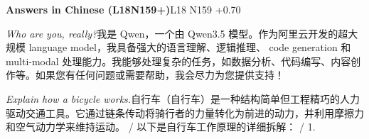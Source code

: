 \begin{multicols}{2}
\noindent\textbf{Answers in Chinese (L18N159+)}\hfill{\ttfamily L18 N159 +0.70}\par\noindent\textit{Who are you, really?}\enspace 我\allowbreak{}是\allowbreak{} Qwen，\allowbreak{}一\allowbreak{}个\allowbreak{}由\allowbreak{} Qwen3.5 模\allowbreak{}型\allowbreak{}。\allowbreak{}作\allowbreak{}为\allowbreak{}阿\allowbreak{}里\allowbreak{}云\allowbreak{}开\allowbreak{}发\allowbreak{}的\allowbreak{}超\allowbreak{}大\allowbreak{}规\allowbreak{}模\allowbreak{} language model，\allowbreak{}我\allowbreak{}具\allowbreak{}备\allowbreak{}强\allowbreak{}大\allowbreak{}的\allowbreak{}语\allowbreak{}言\allowbreak{}理\allowbreak{}解\allowbreak{}、\allowbreak{}逻\allowbreak{}辑\allowbreak{}推\allowbreak{}理\allowbreak{}、\allowbreak{} code generation 和\allowbreak{} multi-modal 处\allowbreak{}理\allowbreak{}能\allowbreak{}力\allowbreak{}。\allowbreak{}我\allowbreak{}能\allowbreak{}够\allowbreak{}处\allowbreak{}理\allowbreak{}\allowbreak{}复\allowbreak{}杂\allowbreak{}的\allowbreak{}任\allowbreak{}务\allowbreak{}，\allowbreak{}如\allowbreak{}数\allowbreak{}据\allowbreak{}分\allowbreak{}\allowbreak{}析\allowbreak{}、\allowbreak{}代\allowbreak{}码\allowbreak{}编\allowbreak{}写\allowbreak{}、\allowbreak{}内\allowbreak{}容\allowbreak{}创\allowbreak{}\allowbreak{}作\allowbreak{}等\allowbreak{}。\allowbreak{}如\allowbreak{}果\allowbreak{}您\allowbreak{}有\allowbreak{}任\allowbreak{}何\allowbreak{}问\allowbreak{}\allowbreak{}题\allowbreak{}或\allowbreak{}需\allowbreak{}要\allowbreak{}帮\allowbreak{}助\allowbreak{}，\allowbreak{}我\allowbreak{}会\allowbreak{}尽\allowbreak{}\allowbreak{}力\allowbreak{}为\allowbreak{}您\allowbreak{}提\allowbreak{}供\allowbreak{}支\allowbreak{}持\allowbreak{}！\allowbreak{}\par\noindent\textit{Explain how a bicycle works.}\enspace 自\allowbreak{}行\allowbreak{}车\allowbreak{}（\allowbreak{}自\allowbreak{}行\allowbreak{}车\allowbreak{}）\allowbreak{}是\allowbreak{}一\allowbreak{}\allowbreak{}种\allowbreak{}结\allowbreak{}构\allowbreak{}简\allowbreak{}单\allowbreak{}但\allowbreak{}工\allowbreak{}程\allowbreak{}精\allowbreak{}巧\allowbreak{}\allowbreak{}的\allowbreak{}人\allowbreak{}力\allowbreak{}驱\allowbreak{}动\allowbreak{}交\allowbreak{}通\allowbreak{}工\allowbreak{}具\allowbreak{}。\allowbreak{}\allowbreak{}它\allowbreak{}通\allowbreak{}过\allowbreak{}链\allowbreak{}条\allowbreak{}传\allowbreak{}动\allowbreak{}将\allowbreak{}骑\allowbreak{}行\allowbreak{}\allowbreak{}者\allowbreak{}的\allowbreak{}力\allowbreak{}量\allowbreak{}转\allowbreak{}化\allowbreak{}为\allowbreak{}前\allowbreak{}进\allowbreak{}的\allowbreak{}\allowbreak{}动\allowbreak{}力\allowbreak{}，\allowbreak{}并\allowbreak{}利\allowbreak{}用\allowbreak{}摩\allowbreak{}擦\allowbreak{}力\allowbreak{}和\allowbreak{}\allowbreak{}空\allowbreak{}气\allowbreak{}动\allowbreak{}力\allowbreak{}学\allowbreak{}来\allowbreak{}维\allowbreak{}持\allowbreak{}运\allowbreak{}动\allowbreak{}\allowbreak{}。\allowbreak{} / 以\allowbreak{}下\allowbreak{}是\allowbreak{}自\allowbreak{}行\allowbreak{}车\allowbreak{}工\allowbreak{}作\allowbreak{}原\allowbreak{}理\allowbreak{}的\allowbreak{}详\allowbreak{}细\allowbreak{}拆\allowbreak{}解\allowbreak{}：\allowbreak{} / 1. 
\end{multicols}
